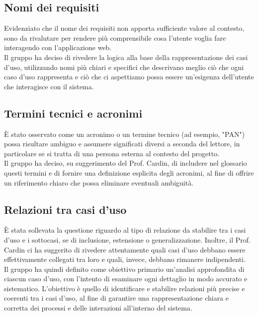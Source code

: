 \subsection{Nomi dei requisiti}
Evidenziato che il nome dei requisiti non apporta sufficiente valore al contesto, sono da rivalutare per rendere più comprensibile cosa l'utente voglia fare interagendo con l'applicazione web.\\
Il gruppo ha deciso di rivedere la logica alla base della rappresentazione dei casi d'uso, utilizzando nomi più chiari e specifici che descrivano meglio ciò che ogni caso d'uso rappresenta e ciò che ci aspettiamo possa essere un'esigenza dell'utente che interagisce con il sistema.
\subsection{Termini tecnici e acronimi}
È stato osservato come un acronimo o un termine tecnico (ad esempio, "PAN") possa risultare ambiguo e assumere significati diversi a seconda del lettore, in particolare se si tratta di una persona esterna al contesto del progetto.\\
Il gruppo ha deciso, su suggerimento del Prof. Cardin, di includere nel glossario questi termini e di fornire una definizione esplicita degli acronimi, al fine di offrire un riferimento chiaro che possa eliminare eventuali ambiguità.
\subsection{Relazioni tra casi d'uso}
È stata sollevata la questione riguardo al tipo di relazione da stabilire tra i casi d'uso e i sottocasi, se di inclusione, estensione o generalizzazione. Inoltre, il Prof. Cardin ci ha suggerito di rivedere attentamente quali casi d'uso debbano essere effettivamente collegati tra loro e quali, invece, debbano rimanere indipendenti.\\
Il gruppo ha quindi definito come obiettivo primario un'analisi approfondita di ciascun caso d'uso, con l'intento di esaminare ogni dettaglio in modo accurato e sistematico. L'obiettivo è quello di identificare e stabilire relazioni più precise e coerenti tra i casi d'uso, al fine di garantire una rappresentazione chiara e corretta dei processi e delle interazioni all'interno del sistema.

